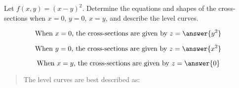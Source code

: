 \documentclass{ximera}
\author{David Guichard \and Neal Koblitz \and H. Jerome Keisler \and Albert Scheller \and Barry Balof \and Mike Wills \and Matthew Carr}
\begin{document}
\begin{exercise}




Let $f(x,y)=(x-y)^2$. Determine the equations and shapes of the cross-sections when $x=0$, $y=0$, $x=y$, and describe the level curves.

\begin{prompt}
\[
\text{When $x=0$, the cross-sections are given by } z=\answer{y^2}
\]
\end{prompt}
\begin{prompt}
\[
\text{When $y=0$, the cross-sections are given by } z=\answer{x^2}
\]
\end{prompt}
\begin{prompt}
\[
\text{When $x=y$, the cross-sections are given by } z=\answer{0}
\]
\end{prompt}

\begin{quote}
The level curves are best described as:
\end{quote}
\begin{multipleChoice}
\end{multipleChoice}

\end{exercise}
\end{document}
